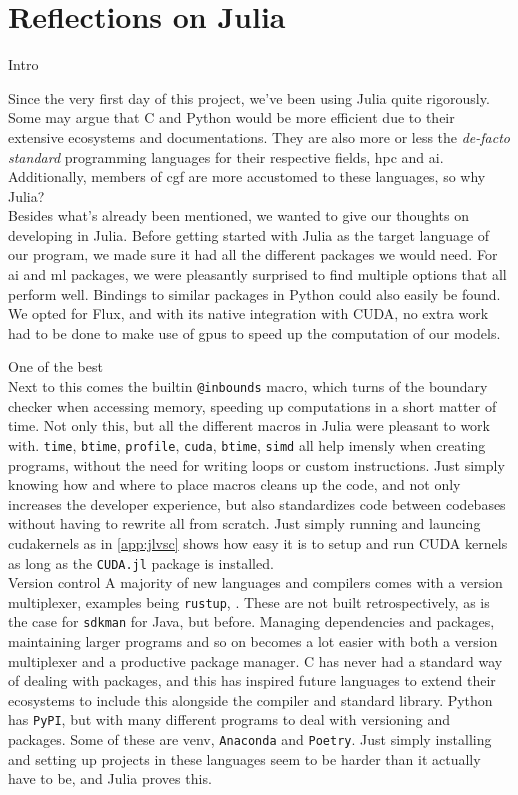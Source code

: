 \chapter*{Reflections on Julia}
\label{chap:juliaref}

Intro

Since the very first day of this project, we've been using Julia quite rigorously. Some may argue that C and Python would be more efficient due to their extensive ecosystems and documentations. They are also more or less the \textit{de-facto standard} programming languages for their respective fields, \acrshort{hpc} and \acrshort{ai}. Additionally, members of \acrshort{cgf} are more accustomed to these languages, so why Julia? \\

Besides what's already been mentioned, we wanted to give our thoughts on developing in Julia. Before getting started with Julia as the target language of our program, we made sure it had all the different packages we would need. For \acrshort{ai} and \acrshort{ml} packages, we were pleasantly surprised to find multiple options that all perform well. Bindings to similar packages in Python could also easily be found. We opted for Flux, and with its native integration with CUDA, no extra work had to be done to make use of \acrshort{gpu}s to speed up the computation of our models.

One of the best \\ 
Next to this comes the builtin \texttt{@inbounds} macro, which turns of the boundary checker when accessing memory, speeding up computations in a short matter of time. Not only this, but all the different macros in Julia were pleasant to work with. \texttt{time}, \texttt{btime}, \texttt{profile}, \texttt{cuda}, \texttt{btime}, \texttt{simd} all help imensly when creating programs, without the need for writing loops or custom instructions. Just simply knowing how and where to place macros cleans up the code, and not only increases the developer experience, but also standardizes code between codebases without having to rewrite all from scratch. Just simply running and launcing cudakernels as in \ref{app:jlvsc} shows how easy it is to setup and run CUDA kernels as long as the \texttt{CUDA.jl} package is installed. \\

Version control
A majority of new languages and compilers comes with a version multiplexer, examples being \texttt{rustup}, \texttt{}. These are not built retrospectively, as is the case for \texttt{sdkman} for Java, but before. Managing dependencies and packages, maintaining larger programs and so on becomes a lot easier with both a version multiplexer and a productive package manager. C has never had a standard way of dealing with packages, and this has inspired future languages to extend their ecosystems to include this alongside the compiler and standard library. Python has \texttt{PyPI}, but with many different programs to deal with versioning and packages. Some of these are venv, \texttt{Anaconda} and \texttt{Poetry}. Just simply installing and setting up projects in these languages seem to be harder than it actually have to be, and Julia proves this. \\ 

